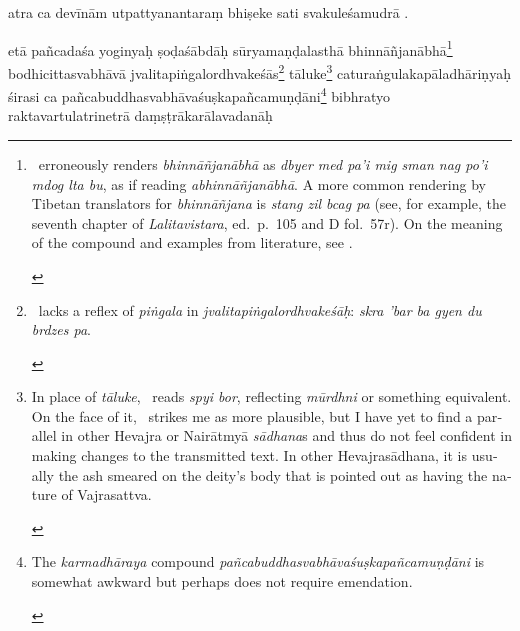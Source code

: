 \documentclass[naipra.tex]{subfiles}
\begin{document}
\begin{sanskrit}
\pstart
atra ca devīnām utpattyanantaraṃ bhiṣeke sati svakuleśamudrā . 
\pend


\pstart
etā pañcadaśa yoginyaḥ ṣoḍaśābdāḥ sūryamaṇḍalasthā bhinnāñjanābhā\footnote{
	\begin{english}%
		\TIB\ erroneously renders \emph{bhinnāñjanābhā} as \emph{dbyer med pa'i mig sman nag po'i mdog lta bu}, as if reading \emph{abhinnāñjanābhā}.
		A more common rendering by Tibetan translators for \emph{bhinnāñjana} is \emph{stang zil bcag pa} (see, for example, the seventh chapter of \emph{Lalitavistara}, ed.\ p.\ 105 and D fol.\ 57r).
		On the meaning of the compound and examples from literature, see \cite{vogel1968}.
	\end{english}
} bodhicittasvabhāvā jvalitapiṅgalordhvakeśās\footnote{
	\begin{english}%
		\TIB\ lacks a reflex of \emph{piṅgala} in \emph{jvalitapiṅgalordhvakeśāḥ}: \emph{skra 'bar ba gyen du brdzes pa}.
	\end{english}
} \crux tāluke\crux\footnote{
	\begin{english}%
		In place of \emph{tāluke}, \TIB\ reads \emph{spyi bor}, reflecting \emph{mūrdhni} or something equivalent.
		On the face of it, \TIB\ strikes me as more plausible, but I have yet to find a parallel in other Hevajra or Nairātmyā \emph{sādhana}s and thus do not feel confident in making changes to the transmitted text. 
		In other Hevajrasādhana, it is usually the ash smeared on the deity's body that is pointed out as having the nature of Vajrasattva.
	\end{english}
} caturaṅgulakapāladhāriṇyaḥ śirasi ca pañcabuddhasvabhāvaśuṣkapañcamuṇḍāni\footnote{
	\begin{english}%
		The \emph{karmadhāraya} compound \emph{pañcabuddhasvabhāvaśuṣkapañcamuṇḍāni} is somewhat awkward but perhaps does not require emendation.
	\end{english}
} bibhratyo raktavartulatrinetrā daṃṣṭrākarālavadanāḥ 
\end{sanskrit}
\end{document}
